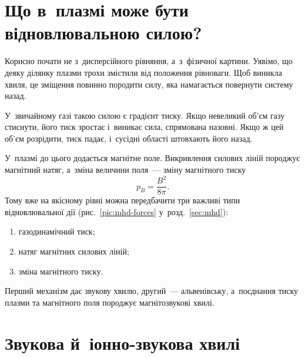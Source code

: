 \section{Що в~плазмі може бути відновлювальною силою?}



Корисно почати не з~дисперсійного рівняння, а~з~фізичної картини. Уявімо, що деяку ділянку
плазми трохи змістили від положення рівноваги. Щоб виникла хвиля, це зміщення повинно
породити силу, яка намагається повернути систему назад.

У~звичайному газі такою силою є градієнт тиску. Якщо невеликий об'єм газу стиснути, його
тиск зростає і~виникає сила, спрямована назовні. Якщо ж цей об'єм розрідити, тиск падає,
і~сусідні області штовхають його назад.

У~плазмі до цього додається магнітне поле. Викривлення силових ліній породжує магнітний
натяг, а~зміна величини поля~--- зміну магнітного тиску
\begin{equation}
p_B=\frac{B^2}{8\pi}.
\label{eq:wave-magnetic-pressure}
\end{equation}
Тому вже на якісному рівні можна передбачити три важливі типи відновлювальної дії
(рис.~\ref{pic:mhd-forces} у~розд.~\ref{sec:mhd}):
\begin{enumerate}
\item газодинамічний тиск;
\item натяг магнітних силових ліній;
\item зміна магнітного тиску.
\end{enumerate}

Перший механізм дає звукову хвилю, другий~--- альвенівську, а~поєднання тиску плазми та
магнітного поля породжує магнітозвукові хвилі.



\section{Звукова й~іонно-звукова хвилі}\label{sec:sound-wave}\label{sec:ion-acoustic}



